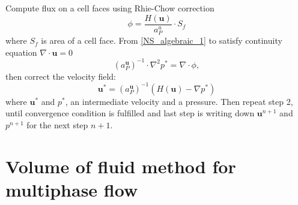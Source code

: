 Compute flux on a cell faces using Rhie-Chow \cite{rhie} correction
\begin{equation}
    \phi = \frac{H(\mathbf{u})}{a^u_P}\cdot S_f
\end{equation}
where $S_f$ is area of a cell face. From \ref{NS_algebraic_1} to satisfy continuity equation $\nabla\cdot \mathbf{u} = 0$
\begin{equation}
    (a_{P}^{\mathbf{u}})^{-1} \cdot \nabla^2 p^* = \nabla \cdot \phi,
\end{equation}
then correct the velocity field:
\begin{equation}
    \mathbf{u}^{*} = (a_{P}^{\mathbf{u}})^{-1}(H(\mathbf{u}) - \nabla p^*)
\end{equation}
where $\mathbf{u}^*$ and $p^*$, an intermediate velocity and a pressure. Then repeat step 2, until convergence condition is fulfilled and last step is writing down $\mathbf{u}^{n+1}$ and $p^{n+1}$ for the next step $n + 1$.

\section{Volume of fluid method for multiphase flow}

